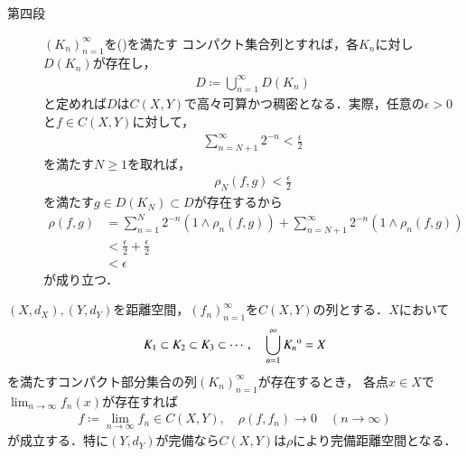 \begin{prf}
\begin{description}
			\item[第四段]				
				$(K_n)_{n=1}^\infty$を()を満たす
				コンパクト集合列とすれば，各$K_n$に対し$D(K_n)$が存在し，
				\begin{align}
					D \coloneqq \bigcup_{n=1}^\infty D(K_n)
				\end{align}
				と定めれば$D$は$C(X,Y)$で高々可算かつ稠密となる．実際，任意の$\epsilon > 0$と$f \in C(X,Y)$に対して，
				\begin{align}
					\sum_{n=N+1}^\infty 2^{-n} < \frac{\epsilon}{2}
				\end{align}
				を満たす$N \geq 1$を取れば，
				\begin{align}
					\rho_N(f,g) < \frac{\epsilon}{2}
				\end{align}
				を満たす$g \in D(K_N) \subset D$が存在するから
				\begin{align}
					\rho(f,g) &= \sum_{n=1}^N 2^{-n} \left( 1 \wedge \rho_n(f,g) \right)
						+ \sum_{n=N+1}^\infty 2^{-n} \left( 1 \wedge \rho_n(f,g) \right) \\
					&< \frac{\epsilon}{2} + \frac{\epsilon}{2} \\
					&< \epsilon
				\end{align}
				が成り立つ．
				\QED
		\end{description}
	\end{prf}
	
	\begin{screen}
		\begin{thm}[$C(X,Y)$の完備性]\label{thm:completeness_of_spaces_of_continuous_functions}
			$(X,d_X),(Y,d_Y)$を距離空間，$(f_n)_{n=1}^\infty$を$C(X,Y)$の列とする．$X$において
			\begin{align}
				K_1 \subset K_2 \subset K_3 \subset \cdots,
				\quad \bigcup_{n=1}^\infty {\kern0ptK_n}^{\mathrm{o}} = X
				\label{eq:completeness_and_separability_of_space_of_continuous_functions_2}
			\end{align}
			を満たすコンパクト部分集合の列$(K_n)_{n=1}^\infty$が存在するとき，
			各点$x \in X$で$\lim_{n \to \infty} f_n(x)$が存在すれば
			\begin{align}
				f \coloneqq \lim_{n \to \infty} f_n \in C(X,Y),
				\quad \rho(f,f_n) \longrightarrow 0 \quad (n \longrightarrow \infty)
				\label{eq:completeness_and_separability_of_space_of_continuous_functions_3}
			\end{align}
			が成立する．特に$(Y,d_Y)$が完備なら$C(X,Y)$は$\rho$により完備距離空間となる．
		\end{thm}
	\end{screen}
	
